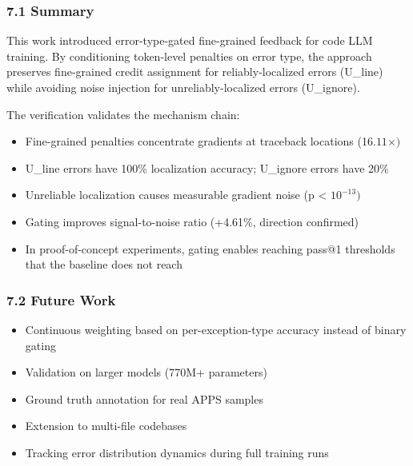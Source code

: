 
\subsubsection{7.1 Summary}

This work introduced error-type-gated fine-grained feedback for code LLM training. By conditioning token-level penalties on error type, the approach preserves fine-grained credit assignment for reliably-localized errors (U\_line) while avoiding noise injection for unreliably-localized errors (U\_ignore).

The verification validates the mechanism chain:
\begin{itemize}
\item Fine-grained penalties concentrate gradients at traceback locations (16.$11\times )$
\item U\_line errors have 100\% localization accuracy; U\_ignore errors have 20\%
\item Unreliable localization causes measurable gradient noise (p < $10^{-13})$
\item Gating improves signal-to-noise ratio (+4.61\%, direction confirmed)
\item In proof-of-concept experiments, gating enables reaching pass@1 thresholds that the baseline does not reach
\end{itemize}

\subsubsection{7.2 Future Work}

\begin{itemize}
\item Continuous weighting based on per-exception-type accuracy instead of binary gating
\item Validation on larger models (770M+ parameters)
\item Ground truth annotation for real APPS samples
\item Extension to multi-file codebases
\item Tracking error distribution dynamics during full training runs
\end{itemize}

